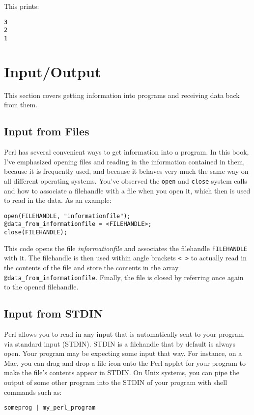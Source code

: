 This prints:

\begin{lstlisting}
3
2
1
\end{lstlisting}

\section{Input/Output}
This section covers getting information into programs and receiving data back from them.

\subsection{Input from Files}
Perl has several convenient ways to get information into a program. In this book, I've emphasized opening files and reading in the information contained in them, because it is frequently used, and because it behaves very much the same way on all different operating systems. You've observed the \verb|open| and \verb|close| system calls and how to associate a filehandle with a file when you open it, which then is used to read in the data. As an example:

\begin{lstlisting}
open(FILEHANDLE, "informationfile");
@data_from_informationfile = <FILEHANDLE>;
close(FILEHANDLE);
\end{lstlisting}

This code opens the file \textit{informationfile} and associates the filehandle \verb|FILEHANDLE| with it. The filehandle is then used within angle brackets \verb|< >| to actually read in the contents of the file and store the contents in the array \verb|@data_from_informationfile|. Finally, the file is closed by referring once again to the opened filehandle.

\subsection{Input from STDIN}
Perl allows you to read in any input that is automatically sent to your program via standard input (STDIN). STDIN is a filehandle that by default is always open. Your program may be expecting some input that way. For instance, on a Mac, you can drag and drop a file icon onto the Perl applet for your program to make the file's contents appear in STDIN. On Unix systems, you can pipe the output of some other program into the STDIN of your program with shell commands such as:

\begin{lstlisting}
someprog | my_perl_program 
\end{lstlisting}

